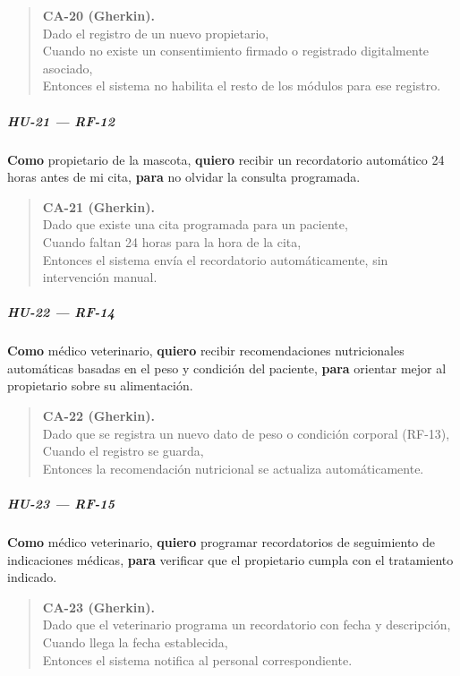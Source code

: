 \documentclass[
]{article}
\begin{document}
\begin{quote}
\textbf{CA-20 (Gherkin).} \\
Dado el registro de un nuevo propietario, \\
Cuando no existe un consentimiento firmado o registrado digitalmente asociado, \\
Entonces el sistema no habilita el resto de los módulos para ese registro.
\end{quote}

\subparagraph{HU-21 --- RF-12}
\textbf{Como} propietario de la mascota,
\textbf{quiero} recibir un recordatorio automático 24 horas antes de mi cita,
\textbf{para} no olvidar la consulta programada.

\begin{quote}
\textbf{CA-21 (Gherkin).} \\
Dado que existe una cita programada para un paciente, \\
Cuando faltan 24 horas para la hora de la cita, \\
Entonces el sistema envía el recordatorio automáticamente, sin intervención manual.
\end{quote}

\subparagraph{HU-22 --- RF-14}
\textbf{Como} médico veterinario,
\textbf{quiero} recibir recomendaciones nutricionales automáticas basadas en el peso y condición del paciente,
\textbf{para} orientar mejor al propietario sobre su alimentación.

\begin{quote}
\textbf{CA-22 (Gherkin).} \\
Dado que se registra un nuevo dato de peso o condición corporal (RF-13), \\
Cuando el registro se guarda, \\
Entonces la recomendación nutricional se actualiza automáticamente.
\end{quote}

\subparagraph{HU-23 --- RF-15}
\textbf{Como} médico veterinario,
\textbf{quiero} programar recordatorios de seguimiento de indicaciones médicas,
\textbf{para} verificar que el propietario cumpla con el tratamiento indicado.

\begin{quote}
\textbf{CA-23 (Gherkin).} \\
Dado que el veterinario programa un recordatorio con fecha y descripción, \\
Cuando llega la fecha establecida, \\
Entonces el sistema notifica al personal correspondiente.
\end{quote}
\end{document}
